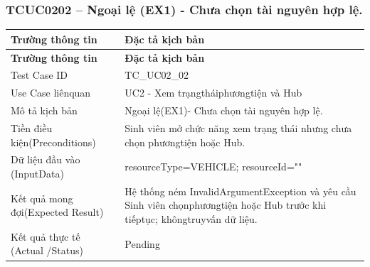 \subsubsection{TCUC0202 – Ngoại lệ (EX1) - Chưa chọn tài nguyên hợp lệ.}
\begin{longtable}{|L{0.24\textwidth}|L{0.70\textwidth}|}
\hline
\textbf{Trường thông tin} & \textbf{Đặc tả kịch bản} \\
\hline
\endfirsthead
\hline
\textbf{Trường thông tin} & \textbf{Đặc tả kịch bản} \\
\hline
\endhead
Test Case ID & TC\_UC02\_02 \\
\hline
Use Case liênquan & UC2 - Xem trạngtháiphươngtiện và Hub \\
\hline
Mô tả kịch bản & Ngoại lệ(EX1)- Chưa chọn tài nguyên hợp lệ. \\
\hline
Tiền điều kiện\newline (Preconditions) & Sinh viên mở chức năng xem trạng thái nhưng chưa chọn phương\newline tiện hoặc Hub. \\
\hline
Dữ liệu đầu vào (Input\newline Data) & resourceType=VEHICLE; resourceId="" \\
\hline
Kết quả mong đợi\newline (Expected Result) & Hệ thống ném InvalidArgumentException và yêu cầu Sinh viên chọn\newline phươngtiện hoặc Hub trước khi tiếptục; khôngtruyvấn dữ liệu. \\
\hline
Kết quả thực tế (Actual /\newline Status) & Pending \\
\hline
\end{longtable}
\vspace{-0.5\baselineskip}
